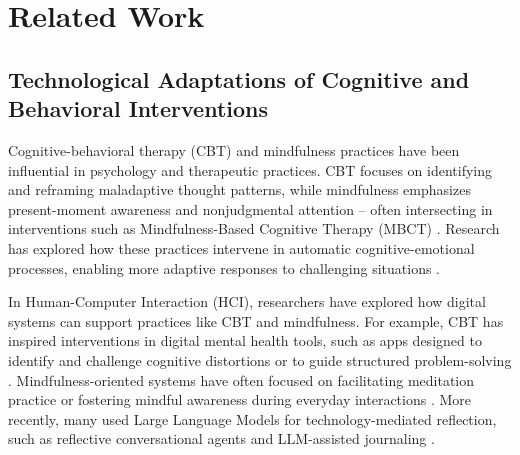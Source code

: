 \section{Related Work}
\subsection{Technological Adaptations of Cognitive and Behavioral Interventions}



Cognitive-behavioral therapy (CBT) and mindfulness practices have been influential in psychology and therapeutic practices. CBT focuses on identifying and reframing maladaptive thought patterns, while mindfulness emphasizes present-moment awareness and nonjudgmental attention – often intersecting in interventions such as Mindfulness-Based Cognitive Therapy (MBCT) \cite{teasdale2000prevention}. Research has explored how these practices intervene in automatic cognitive-emotional processes, enabling more adaptive responses to challenging situations \cite{farb2014mindfulness}.


In Human-Computer Interaction (HCI), researchers have explored how digital systems can support practices like CBT and mindfulness. For example, CBT has inspired interventions in digital mental health tools, such as apps designed to identify and challenge cognitive distortions or to guide structured problem-solving \cite{bernstein2022human, rathbone2017assessing, kuhn2016cbt}. Mindfulness-oriented systems have often focused on facilitating meditation practice or fostering mindful awareness during everyday interactions \cite{terzimehic2019review}. More recently, many used Large Language Models for technology-mediated reflection, such as reflective conversational agents \cite{li2023exploring} and LLM-assisted journaling \cite{nepal2024contextual, song2024exploreself, kim2024mindfuldiary}. 

